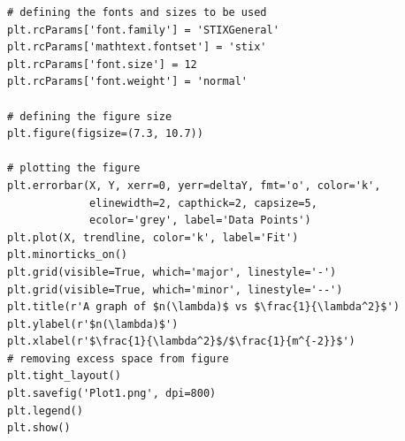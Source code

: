 \documentclass[12pt, a4paper]{article}
\begin{document}
\begin{verbatim}
# defining the fonts and sizes to be used
plt.rcParams['font.family'] = 'STIXGeneral'
plt.rcParams['mathtext.fontset'] = 'stix'
plt.rcParams['font.size'] = 12
plt.rcParams['font.weight'] = 'normal'

# defining the figure size
plt.figure(figsize=(7.3, 10.7))

# plotting the figure
plt.errorbar(X, Y, xerr=0, yerr=deltaY, fmt='o', color='k', 
             elinewidth=2, capthick=2, capsize=5,
             ecolor='grey', label='Data Points')
plt.plot(X, trendline, color='k', label='Fit')
plt.minorticks_on()
plt.grid(visible=True, which='major', linestyle='-')
plt.grid(visible=True, which='minor', linestyle='--')
plt.title(r'A graph of $n(\lambda)$ vs $\frac{1}{\lambda^2}$')
plt.ylabel(r'$n(\lambda)$')
plt.xlabel(r'$\frac{1}{\lambda^2}$/$\frac{1}{m^{-2}}$')
# removing excess space from figure
plt.tight_layout()
plt.savefig('Plot1.png', dpi=800)
plt.legend()
plt.show()
\end{verbatim}
\end{document}
